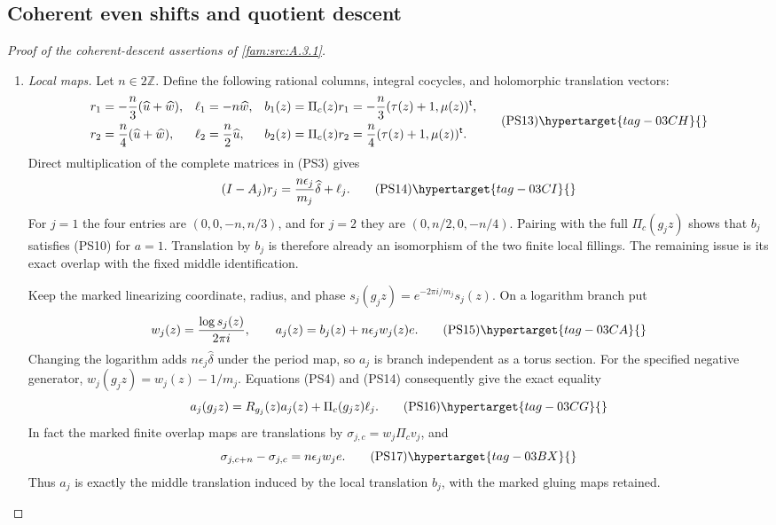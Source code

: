 \subsection{Coherent even shifts and quotient descent}
\label{I:coherent-descent-proof}
\begin{proof}[Proof of the coherent-descent assertions of \cref{fam:src:A.3.1}]
\begin{enumerate}[label=\arabic*.,leftmargin=*]
\item \emph{Local maps.}
Let $n\in2\mathbb Z$. Define the following rational columns,
integral cocycles, and holomorphic translation vectors:
\[
\begin{aligned}
 r_1&=-\frac n3(\widehat u+\widehat w),&
 \ell_1&=-n\widehat w,&
 b_1(z)&=\Pi_c(z)r_1=-\frac n3(\tau(z)+1,\mu(z))^{\mathsf t},\\
 r_2&= \frac n4(\widehat u+\widehat w),&
 \ell_2&=\frac n2\widehat u,&
 b_2(z)&=\Pi_c(z)r_2=\frac n4(\tau(z)+1,\mu(z))^{\mathsf t}.
\end{aligned}
\tag{PS13}\hypertarget{tag-03CH}{}\label{wb:pshift:eq:local-corrections}
\]
Direct multiplication of the complete matrices in (PS3) gives
\[
 (I-A_j)r_j=\frac{n\epsilon_j}{m_j}\widehat\delta+\ell_j.
 \tag{PS14}\hypertarget{tag-03CI}{}\label{wb:pshift:eq:local-matrix-identity}
\]
For $j=1$ the four entries are $(0,0,-n,n/3)$, and for $j=2$
they are $(0,n/2,0,-n/4)$. Pairing with the full $\Pi_c(g_jz)$
shows that $b_j$ satisfies (PS10) for $a=1$.
Translation by $b_j$ is therefore already an isomorphism of the
two finite local fillings. The remaining issue is its exact overlap
with the fixed middle identification.

Keep the marked linearizing coordinate, radius, and phase
$s_j(g_jz)=e^{-2\pi i/m_j}s_j(z)$. On a logarithm branch put
\[
 w_j(z)=\frac{\log s_j(z)}{2\pi i},\qquad
 a_j(z)=b_j(z)+n\epsilon_j w_j(z)e.
 \tag{PS15}\hypertarget{tag-03CA}{}\label{wb:pshift:eq:finite-middle-sections}
\]
Changing the logarithm adds $n\epsilon_j\widehat\delta$ under the
period map, so $a_j$ is branch independent as a torus section.
For the specified negative generator, $w_j(g_jz)=w_j(z)-1/m_j$.
Equations (PS4) and (PS14) consequently give the exact equality
\[
 a_j(g_jz)=R_{g_j}(z)a_j(z)+\Pi_c(g_jz)\ell_j.
 \tag{PS16}\hypertarget{tag-03CG}{}\label{wb:pshift:eq:local-affine-cocycle}
\]
In fact the marked finite overlap maps are translations by
$\sigma_{j,c}=w_j\Pi_c v_j$, and
\[
                  \sigma_{j,c+n}-\sigma_{j,c}
                     =n\epsilon_jw_je.
 \tag{PS17}\hypertarget{tag-03BX}{}\label{wb:pshift:eq:actual-overlap-difference}
\]
Thus $a_j$ is exactly the middle translation induced by the local
translation $b_j$, with the marked gluing maps retained.


\end{enumerate}
\end{proof}
